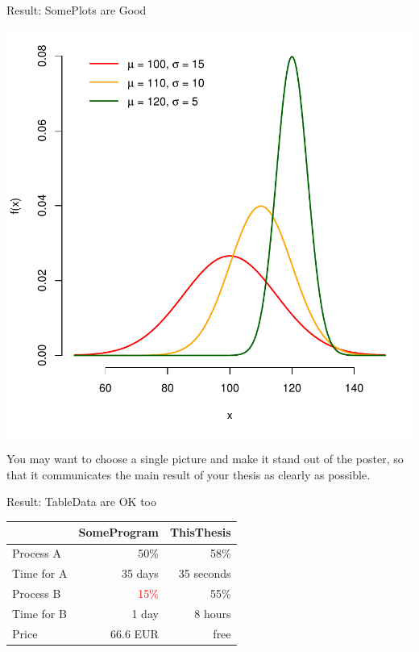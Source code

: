 \documentclass[portrait,a0paper,fontscale=0.25]{baposter}
\begin{document}
\begin{poster}
%
%


%
%
%

\begin{posterbox}[column=1, name=result1]{Result: SomePlots are Good}
\begin{center}
\includegraphics[width=0.7\linewidth]{img/ukazka-obr02.pdf}
\end{center}

You may want to choose a single picture and make it stand out of the poster, so that it communicates the main result of your thesis as clearly as possible.
\end{posterbox}

\begin{posterbox}[column=1, name=result2, below=result1]{Result: TableData are OK too}
\begin{center}
\begin{tabular}{lrr}
 & \textbf{SomeProgram} & \textbf{ThisThesis} \\
\hline
Process A & 50\% & 58\% \\
Time for A & 35 days & \textcolor{green!80!black}{35 seconds} \\
Process B & \textcolor{red}{15\%} & 55\% \\
Time for B & 1 day & 8 hours \\
Price & 66.6 EUR & free
\end{tabular}
\end{center}
\end{posterbox}


\end{poster}
\end{document}
